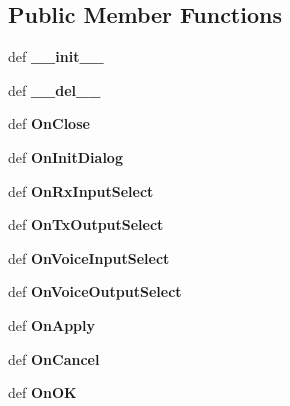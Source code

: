 \subsection*{Public Member Functions}
\begin{DoxyCompactItemize}
\item 
\hypertarget{classtop_frame_1_1_dlg_audio_a7a495d594fc6fb325e0cd93e39c0c237}{def {\bfseries \-\_\-\-\_\-init\-\_\-\-\_\-}}\label{classtop_frame_1_1_dlg_audio_a7a495d594fc6fb325e0cd93e39c0c237}

\item 
\hypertarget{classtop_frame_1_1_dlg_audio_a40d7e3d63aae25f330a6ea0e5e05bb6d}{def {\bfseries \-\_\-\-\_\-del\-\_\-\-\_\-}}\label{classtop_frame_1_1_dlg_audio_a40d7e3d63aae25f330a6ea0e5e05bb6d}

\item 
\hypertarget{classtop_frame_1_1_dlg_audio_ac5ce3a5e6041b81de54891b76894eaf9}{def {\bfseries On\-Close}}\label{classtop_frame_1_1_dlg_audio_ac5ce3a5e6041b81de54891b76894eaf9}

\item 
\hypertarget{classtop_frame_1_1_dlg_audio_a1fb91492068da9f9e4fa363dbdf6b0f1}{def {\bfseries On\-Init\-Dialog}}\label{classtop_frame_1_1_dlg_audio_a1fb91492068da9f9e4fa363dbdf6b0f1}

\item 
\hypertarget{classtop_frame_1_1_dlg_audio_a91ecef8ce46e5cb387e2e9d4ceec1918}{def {\bfseries On\-Rx\-Input\-Select}}\label{classtop_frame_1_1_dlg_audio_a91ecef8ce46e5cb387e2e9d4ceec1918}

\item 
\hypertarget{classtop_frame_1_1_dlg_audio_ae57365fbf3c98ce03687277de302971d}{def {\bfseries On\-Tx\-Output\-Select}}\label{classtop_frame_1_1_dlg_audio_ae57365fbf3c98ce03687277de302971d}

\item 
\hypertarget{classtop_frame_1_1_dlg_audio_a6428699a235365093280c1bb2b62ea94}{def {\bfseries On\-Voice\-Input\-Select}}\label{classtop_frame_1_1_dlg_audio_a6428699a235365093280c1bb2b62ea94}

\item 
\hypertarget{classtop_frame_1_1_dlg_audio_a04e5ac28611d729225f9c4b6c627169c}{def {\bfseries On\-Voice\-Output\-Select}}\label{classtop_frame_1_1_dlg_audio_a04e5ac28611d729225f9c4b6c627169c}

\item 
\hypertarget{classtop_frame_1_1_dlg_audio_ae6adfc873b828014e46bb3e203b45839}{def {\bfseries On\-Apply}}\label{classtop_frame_1_1_dlg_audio_ae6adfc873b828014e46bb3e203b45839}

\item 
\hypertarget{classtop_frame_1_1_dlg_audio_af7cc1df100353fbf6b3495d78d084a5f}{def {\bfseries On\-Cancel}}\label{classtop_frame_1_1_dlg_audio_af7cc1df100353fbf6b3495d78d084a5f}

\item 
\hypertarget{classtop_frame_1_1_dlg_audio_a4b53e7ed1cd9b4fcaed11be000854584}{def {\bfseries On\-O\-K}}\label{classtop_frame_1_1_dlg_audio_a4b53e7ed1cd9b4fcaed11be000854584}

\end{DoxyCompactItemize}

